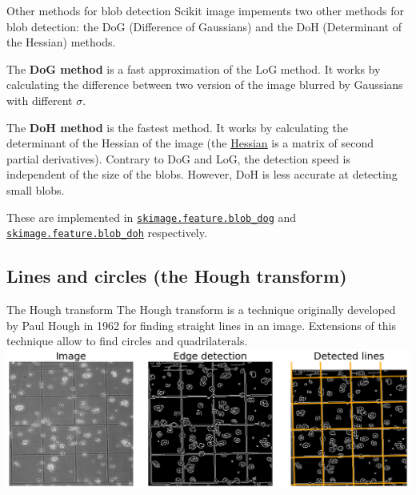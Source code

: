 \documentclass[9pt, aspectratio=169]{beamer}
\begin{document}
\begin{frame}
\begin{columns}
\begin{column}{.3\textwidth}
{            }
        \end{column}
    \end{columns}
\end{frame}

\begin{frame}
{Other methods for blob detection}
Scikit image impements two other methods for blob detection: the DoG (Difference of Gaussians) and the DoH (Determinant of the Hessian) methods.

\pause

The \textbf{DoG method} is a fast approximation of the LoG method. It works by calculating the difference between two version of the image blurred by Gaussians with different $\sigma$.

The \textbf{DoH method} is the fastest method. It works by calculating the determinant of the Hessian of the image (the \href{https://en.wikipedia.org/wiki/Hessian\_matrix}{\underline{Hessian}} is a matrix of second partial derivatives).
Contrary to DoG and LoG, the detection speed is independent of the size of the blobs. However, DoH is less accurate at detecting small blobs.

\pause
These are implemented in \href{https://scikit-image.org/docs/dev/api/skimage.feature.html\#skimage.feature.blob\_dog}{\texttt{\underline{skimage.feature.blob\_dog}}} and \href{https://scikit-image.org/docs/dev/api/skimage.feature.html\#skimage.feature.blob\_doh}{\texttt{\underline{skimage.feature.blob\_doh}}} respectively.
\end{frame}

\subsection{Lines and circles (the Hough transform)}

\begin{frame}
    {The Hough transform}
    The Hough transform is a technique originally developed by Paul Hough in 1962 for finding straight lines in an image. Extensions of this technique allow to find circles and quadrilaterals.
    \centering
    \includegraphics[width=.85\textwidth]{hough_line_overview.png}
\end{frame}
\end{document}
